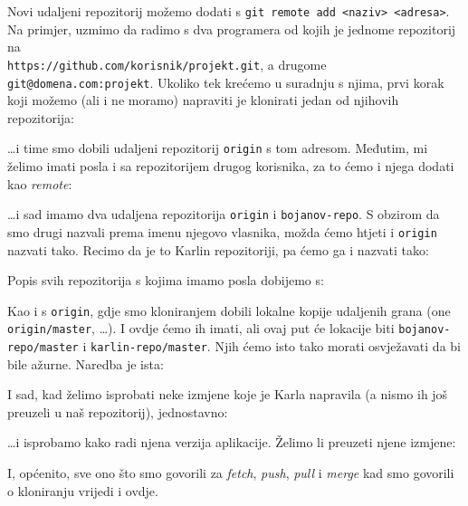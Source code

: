 Novi udaljeni repozitorij možemo dodati s \verb+git remote add <naziv> <adresa>+.
Na primjer, uzmimo da radimo s dva programera od kojih je jednome repozitorij na \\\verb+https://github.com/korisnik/projekt.git+, a drugome \verb+git@domena.com:projekt+.
Ukoliko tek krećemo u suradnju s njima, prvi korak koji možemo (ali i ne moramo) napraviti je klonirati jedan od njihovih repozitorija:


\dots{}i time smo dobili udaljeni repozitorij \verb+origin+ s tom adresom.
Međutim, mi želimo imati posla i sa repozitorijem drugog korisnika, za to ćemo i njega dodati kao \emph{remote}:


\dots{}i sad imamo dva udaljena repozitorija \verb+origin+ i \verb+bojanov-repo+.
S obzirom da smo drugi nazvali prema imenu njegovo vlasnika, možda ćemo htjeti i \verb+origin+ nazvati tako.
Recimo da je to Karlin repozitoriji, pa ćemo ga i nazvati tako:


Popis svih repozitorija s kojima imamo posla dobijemo s:



Kao i s \verb+origin+, gdje smo kloniranjem dobili lokalne kopije udaljenih grana (one \verb+origin/master+, \dots). 
I ovdje ćemo ih imati, ali ovaj put će lokacije biti \verb+bojanov-repo/master+ i \verb+karlin-repo/master+.
Njih ćemo isto tako morati osvježavati da bi bile ažurne.
Naredba je ista:


I sad, kad želimo isprobati neke izmjene koje je Karla napravila (a nismo ih još preuzeli u naš repozitorij), jednostavno:


\dots{}i isprobamo kako radi njena verzija aplikacije. Želimo li preuzeti njene izmjene:


I, općenito, sve ono što smo govorili za \emph{fetch}, \emph{push}, \emph{pull} i \emph{merge} kad smo govorili o kloniranju vrijedi i ovdje.

